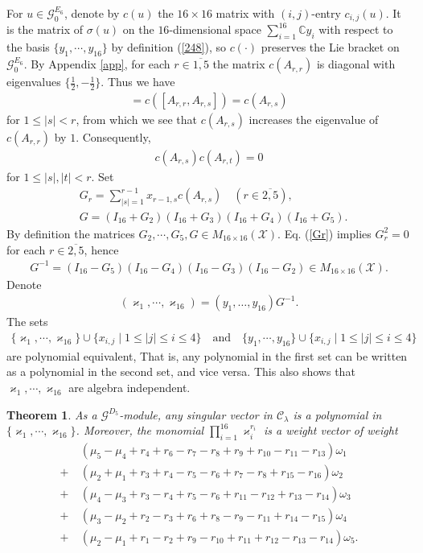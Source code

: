 \documentclass[12pt]{article}
\numberwithin{equation}{section}
\newtheorem{theorem}{Theorem}[section]
\theoremstyle{definition}
\theoremstyle{remark}
\begin{document}
For $u\in\mathscr{G}^{E_6}_0$, 
denote by $c(u)$ the $16\times 16$ matrix with $(i,j)$-entry $c_{i,j}(u)$. It is the matrix of $\sigma(u)$ on the $16$-dimensional space $\sum_{i=1}^{16}\mathbb{C}y_i$ with respect to the basis $\{y_1,\cdots,y_{16}\}$ by definition (\ref{248}), so $c(\cdot)$ preserves the Lie bracket on $\mathscr{G}^{E_6}_0$.
By Appendix \ref{app}, for each $r\in\overline{1,5}$ the matrix $c(A_{r,r})$ is diagonal with eigenvalues $\{\frac{1}{2},-\frac{1}{2}\}$. Thus we have 
\begin{eqnarray}
	[c(A_{r,r}),c(A_{r,s})]=c([A_{r,r},A_{r,s}])=c(A_{r,s})
\end{eqnarray}
for $1\leqslant |s|<r$, from which we see that $c(A_{r,s})$ increases the eigenvalue of $c(A_{r,r})$ by $1$. Consequently,
\begin{eqnarray}
	c(A_{r,s})c(A_{r,t})=0 \label{Gr}
\end{eqnarray}
for $1\leqslant |s|,|t|<r$. Set
\begin{eqnarray}
	&G_r=\sum\limits_{|s|=1}^{r-1}x_{r-1,s}c(A_{r,s})\quad(r\in\overline{2,5}),\label{Gr1}\\
	&G=(I_{16}+G_2)(I_{16}+G_3)(I_{16}+G_4)(I_{16}+G_5).\label{Gr2}
\end{eqnarray}
By definition the matrices $G_2,\cdots,G_5,G\in M_{16\times 16}(\mathscr{X})$. Eq. (\ref{Gr}) implies $G_r^2=0$ for each $r\in\overline{2,5}$, hence 
\begin{eqnarray}
	G^{-1}=(I_{16}-G_5)(I_{16}-G_4)(I_{16}-G_3)(I_{16}-G_2)\in M_{16\times 16}(\mathscr{X}). \label{G-1}
\end{eqnarray}
Denote
\begin{eqnarray}
	(\varkappa_1,\cdots,\varkappa_{16})=(y_1,\dots,y_{16})G^{-1}. 
\end{eqnarray}
The sets
\begin{align}
	\{\varkappa_1,\cdots,\varkappa_{16}\}\cup\{x_{i,j}\mid 1\leqslant|j|\leqslant i\leqslant 4\}\quad\text{and}\quad\{y_1,\cdots,y_{16}\}\cup\{x_{i,j}\mid 1\leqslant|j|\leqslant i\leqslant 4\}
\end{align} 
are polynomial equivalent, That is, any polynomial in the first set can be written as a polynomial in the second set, and vice versa. This also shows that $\varkappa_1,\cdots,\varkappa_{16}$ are algebra independent.
\begin{theorem}
	As a $\mathscr{G}^{D_5}$-module, any singular vector in $\mathscr{C}_{\lambda}$ is a polynomial in $\{\varkappa_1,\cdots,\varkappa_{16}\}$. Moreover, the monomial $\prod_{i=1}^{16}\varkappa_i^{r_i}$ is a weight vector of weight \begin{align}
		&\:(\mu_5-\mu_4+r_4+r_6-r_7-r_8+r_9+r_{10}-r_{11}-r_{13})\omega_1\nonumber\\+&\:(\mu_2+\mu_1+r_3+r_4-r_5-r_6+r_7-r_8+r_{15}-r_{16})\omega_2\nonumber\\
		+&\:(\mu_4-\mu_3+r_3-r_4+r_5-r_6+r_{11}-r_{12}+r_{13}-r_{14})\omega_3\nonumber\\+&\:(\mu_3-\mu_2+r_2-r_3+r_6+r_8-r_9-r_{11}+r_{14}-r_{15})\omega_4\nonumber\\+&\:(\mu_2-\mu_1+r_1-r_2+r_9-r_{10}+r_{11}+r_{12}-r_{13}-r_{14})\omega_5. \label{3.105}
	\end{align}
\end{theorem}
\end{document}
